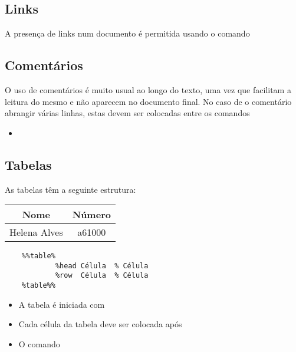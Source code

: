 \documentclass[11pt,a4paper]{article}
\begin{document}
\subsection{Links}
A presença de links num documento é permitida usando o comando \verb@ %link{url,texto} @. No campo "texto" é inserido o texto que fica associado ao link colocado no campo "url".
 

\subsection{Comentários}
O uso de comentários é muito usual ao longo do texto, uma vez que facilitam a leitura do mesmo e não aparecem no documento final. No caso de o comentário abrangir várias linhas, estas devem ser colocadas entre os comandos \verb@ %%coment% e %coment%% @. Por outro lado, se o pretendido for apenas um comentário de linha, coloca-se o texto a comentar após o comando \verb@ %%% @.

\begin{itemize}
    \item \verb@ %%% Isto é um comentário de linha @
\end{itemize}


\subsection{Tabelas} 
As tabelas têm a seguinte estrutura:



            
            

\begin{table}[!htpb]
\centering
\begin{tabular}{||c|c||}
\hline
 \textbf{ Nome   } & \textbf{  Número  } \\
\hline
  Helena Alves   &  a61000 \\
\hline
\end{tabular}
\end{table}



\begin{verbatim}
    %%table%
            %head Célula  % Célula 
            %row  Célula  % Célula  
    %table%%
\end{verbatim}


\begin{itemize}
    \item A tabela é iniciada com \verb@ %%table% @ e finalizada com \verb@ %table%% @;
    \item Cada célula da tabela deve ser colocada após \verb@ %head @ ou \verb@ %row @. A única diferença entre estes, consiste no formato do texto. Enquanto que o comando \verb@ %head @ coloca o texto centrado e a negrito, o comando \verb@ %row @ coloca o texto num formato normal.
    \item O comando \verb@ % @ permite a separação das células da tabela, correspondendo, no entanto, ao número total de colunas.
\end{itemize}
\end{document}
